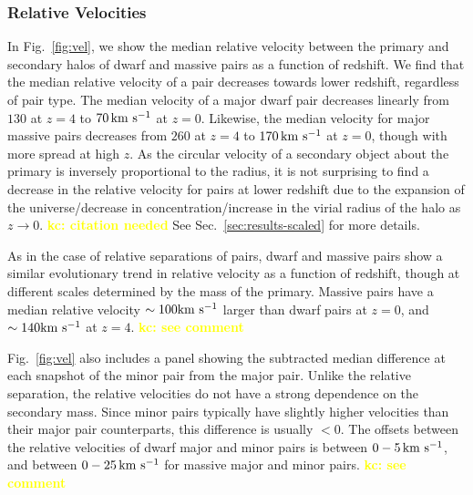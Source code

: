 \documentclass[twocolumn]{aastex631}
\newcommand{\kc}[1]{\textcolor{yellow}{\textbf{kc: #1}} }
\begin{document}
        \subsubsection{Relative Velocities}
        In Fig.~\ref{fig:vel}, we show the median relative velocity between the primary and secondary halos of dwarf and massive pairs as a function of redshift. 
        We find that the median relative velocity of a pair decreases towards lower redshift, regardless of pair type.
        The median velocity of a major dwarf pair decreases linearly from $130$ at $z=4$ to $70\,\mathrm{km}~\mathrm{s}^{-1}$ at $z=0$. Likewise, the median velocity for major massive pairs decreases from $260$ at $z=4$ to $170\,\mathrm{km}~\mathrm{s}^{-1}$ at $z=0$, though with more spread at high $z$.
        As the circular velocity of a secondary object about the primary is inversely proportional to the radius, it is not surprising to find a decrease in the relative velocity for pairs at lower redshift due to the expansion of the universe/decrease in concentration/increase in the virial radius of the halo as $z\to0$. \kc{citation needed}
        See Sec.~\ref{sec:results-scaled} for more details.
        
        As in the case of relative separations of pairs, dwarf and massive pairs show a similar evolutionary trend in relative velocity as a function of redshift, though at different scales determined by the mass of the primary.
        Massive pairs have a median relative velocity $\sim100\mathrm{km}~\mathrm{s}^{-1}$ larger than dwarf pairs at $z=0$, and $\sim140\mathrm{km}~\mathrm{s}^{-1}$ at $z=4$. \kc{see comment}
    
        Fig.~\ref{fig:vel} also includes a panel showing the subtracted median difference at each snapshot of the minor pair from the major pair. Unlike the relative separation, the relative velocities do not have a strong dependence on the secondary mass. 
        Since minor pairs typically have slightly higher velocities than their major pair counterparts, this difference is usually $<0$. The offsets between the relative velocities of dwarf major and minor pairs is between $0-5\,\mathrm{km}~\mathrm{s}^{-1}$, and between $0-25\,\mathrm{km}~\mathrm{s}^{-1}$ for massive major and minor pairs. \kc{see comment} %
        
\end{document}
